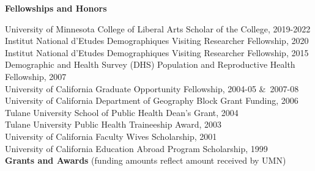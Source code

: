 \documentclass[11pt]{article} %
\begin{document}
\vspace {.5 cm}

\noindent
\textbf {Fellowships and Honors}

\noindent
University of Minnesota College of Liberal Arts Scholar of the College, 2019-2022\\
Institut National d'Etudes Demographiques Visiting Researcher Fellowship, 2020\\
Institut National d'Etudes Demographiques Visiting Researcher Fellowship, 2015\\
Demographic and Health Survey (DHS) Population and Reproductive Health Fellowship, 2007\\
University of California Graduate Opportunity Fellowship, 2004-05 \&\ 2007-08\\
University of California Department of Geography Block Grant Funding, 2006\\
Tulane University School of Public Health Dean's Grant, 2004\\
Tulane University Public Health Traineeship Award, 2003\\           
University of California Faculty Wives Scholarship, 2001\\
University of California Education Abroad Program Scholarship, 1999\\


\noindent
\textbf {Grants and Awards} (funding amounts reflect amount received by UMN)
\end{document}
